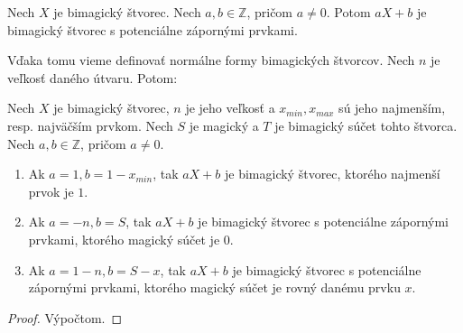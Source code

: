 \begin{consequence} Nech $X$ je bimagický štvorec. Nech $a,b \in \mathbb{Z}$, pričom $a \neq 0$. Potom $aX + b$ je bimagický štvorec s potenciálne zápornými prvkami.
\end{consequence}

Vďaka tomu vieme definovať normálne formy bimagických štvorcov. Nech $n$ je veľkosť daného útvaru. Potom:

\begin{theorem}
\label{5x5bimagic1}
Nech $X$ je bimagický štvorec, $n$ je jeho veľkosť a $x_{min}, x_{max}$ sú jeho najmenším, resp. najväčším prvkom. Nech $S$ je magický a $T$ je bimagický súčet tohto štvorca. Nech $a,b \in \mathbb{Z}$, pričom $a \neq 0$.
\begin{enumerate}
\item Ak $a = 1, b = 1 - x_{min}$, tak $aX+b$ je bimagický štvorec, ktorého najmenší prvok je $1$.
\item Ak $a = -n, b = S$, tak $aX+b$ je bimagický štvorec s potenciálne zápornými prvkami, ktorého magický súčet je $0$.
\item Ak $a = 1-n, b = S-x$, tak $aX+b$ je bimagický štvorec s potenciálne zápornými prvkami, ktorého magický súčet je rovný danému prvku $x$.
\end{enumerate}
\end{theorem}

\begin{proof}
Výpočtom.
\end{proof}


